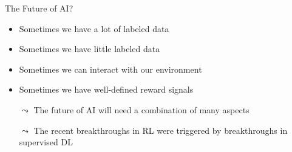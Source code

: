 \begin{frame}[c]{The Future of AI?}
	
	\begin{itemize}
		\item Sometimes we have a lot of labeled data
		\item Sometimes we have little labeled data
		\item Sometimes we can interact with our environment
		\item Sometimes we have well-defined reward signals
		\bigskip
		\pause
		\item[$\leadsto$] The future of AI will need a combination of many aspects
		\item[$\leadsto$] The recent breakthroughs in RL were triggered by breakthroughs in supervised DL  
	\end{itemize}



\end{frame}

